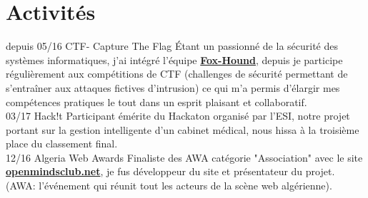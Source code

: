 \documentclass[]{friggeri-cv}
\begin{document}
\newpage
\section{Activités}
\begin{entrylist}
  \entry
    {depuis 05/16}
    {CTF- Capture The Flag}
    {}
    {Étant un passionné de la sécurité des systèmes informatiques, j'ai intégré l'équipe \href{https://web.facebook.com/F0xHo2Nd/}{\textbf{Fox-Hound}}, depuis je participe régulièrement aux compétitions de CTF (challenges de sécurité permettant de s’entraîner aux attaques fictives d’intrusion) ce qui m'a permis d'élargir mes compétences pratiques le tout dans un esprit plaisant et collaboratif.\\}
  \entry
    {03/17}
    {Hack!t}
    {}
    {Participant émérite du Hackaton organisé par l'ESI, notre projet portant sur la gestion intelligente d'un cabinet médical, nous hissa à la troisième place du classement final.\\}
  \entry
    {12/16}
    {Algeria Web Awards}
    {}
    {Finaliste des AWA catégorie "Association" avec le site \href{http://www.openmindsclub.net/}{\textbf{openmindsclub.net}}, je fus développeur du site et présentateur du projet.\\
    (AWA: l’événement qui réunit tout les acteurs de la scène web algérienne).\\}
    
\end{entrylist}
\end{document}
